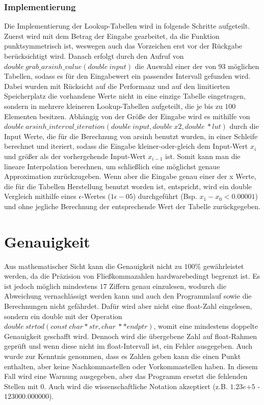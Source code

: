 \documentclass[course=erap]{aspdoc}
\begin{document}
    \subsubsection{Implementierung}
    Die Implementierung der Lookup-Tabellen wird in folgende Schritte aufgeteilt. Zuerst wird mit dem Betrag der Eingabe gearbeitet, da die Funktion punktsymmetrisch ist, weswegen auch das Vorzeichen erst vor der Rückgabe berücksichtigt wird. 
    Danach erfolgt durch den Aufruf von $double \ grab\_arsinh\_value(double \ input)$ die Auswahl einer der von $93$ möglichen Tabellen, sodass es für den Eingabewert ein passendes Intervall gefunden wird. Dabei wurden mit Rücksicht auf die Performanz und auf den limitierten Speicherplatz die vorhandene Werte nicht in eine einzige Tabelle eingetragen, sondern in mehrere kleineren Lookup-Tabellen aufgeteilt, die je bis zu $100$ Elementen besitzen. Abhängig von der Größe der Eingabe wird es mithilfe von $double \ arsinh\_interval\_iteration(double \ input, double \ x2, double \ *lut)$ durch die Input Werte, die für die Berechnung von arsinh benutzt wurden, in einer Schleife berechnet und iteriert, sodass die Eingabe kleiner-oder-gleich dem Input-Wert $x_i$ und größer als der vorhergehende Input-Wert $x_{i-1}$ ist. Somit kann man die lineare Interpolation berechnen, um schließlich eine möglichst genaue Approximation zurückzugeben. 
    Wenn aber die Eingabe genau einer der x Werte, die für die Tabellen Herstellung benutzt worden ist, entspricht, wird ein double Vergleich mithilfe eines $\epsilon$-Wertes ($1\epsilon-05$) durchgeführt (Bsp. $x_1 - x_0 < 0.00001$) und ohne jegliche Berechnung der entsprechende Wert der Tabelle zurückgegeben.
    


 \section{Genauigkeit}
  Aus mathematischer Sicht kann die Genauigkeit nicht zu $100\%$ gewährleistet werden, da die Präzision von Fließkommazahlen hardwarebedingt begrenzt ist. Es ist jedoch möglich mindestens $17$ Ziffern genau einzulesen, wodurch die Abweichung vernachlässigt werden kann und auch den Programmlauf sowie die Berechnungen nicht gefährdet. Dafür wird aber nicht eine float-Zahl eingelesen, sondern ein double mit der Operation $double \ strtod (const \ char* str, char \ **endptr)$, womit eine mindestens doppelte Genauigkeit geschafft wird. Dennoch wird die übergebene Zahl auf float-Rahmen geprüft und wenn diese nicht im float-Intervall ist, ein Fehler ausgegeben. Auch wurde zur Kenntnis genommen, dass es Zahlen geben kann  die einen Punkt enthalten, aber keine Nachkommastellen oder  Vorkommastellen haben. In diesem Fall wird eine Warnung ausgegeben, aber das Programm ersetzt die fehlenden Stellen mit $0$. Auch wird die wissenschaftliche Notation akzeptiert (z.B. $1.23e$+$5$ - $123000.000000$).
\end{document}
